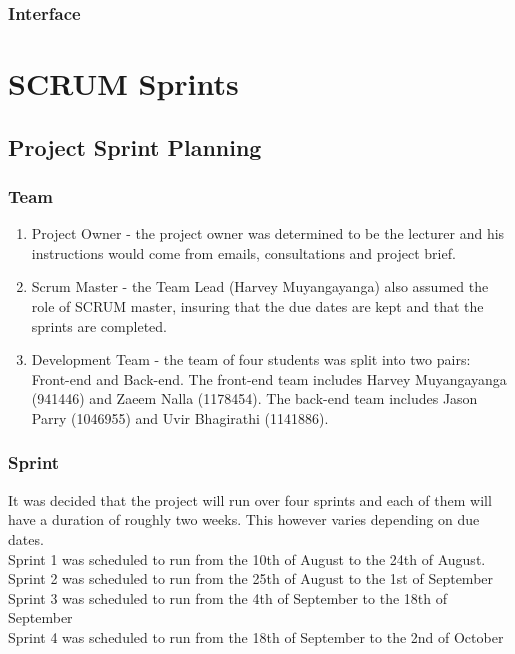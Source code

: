 \documentclass{article}
\begin{document}
\subsubsection{Interface}

\section{SCRUM Sprints}

\subsection{Project Sprint Planning}
\subsubsection{Team}

\begin{enumerate}
\item Project Owner - the project owner was determined to be the lecturer and his instructions
would come from emails, consultations and project brief.
\item Scrum Master - the Team Lead (Harvey Muyangayanga) also assumed the role of SCRUM
master, insuring that the due dates are kept and that the sprints are completed.
\item Development Team - the team of four students was split into two pairs: Front-end and Back-end.
The front-end team includes Harvey Muyangayanga (941446) and Zaeem Nalla (1178454). The back-end team includes Jason Parry (1046955) and Uvir Bhagirathi (1141886).
\end{enumerate}

\subsubsection{Sprint}
It was decided that the project will run over four sprints and each of them will have a duration of roughly two weeks. This however varies depending on due dates.\\
Sprint 1 was scheduled to run from the 10th of August to the 24th of August.\\
Sprint 2 was scheduled to run from the 25th of August to the 1st of September\\
Sprint 3 was scheduled to run from the 4th of September to the 18th of September\\
Sprint 4 was scheduled to run from the 18th of September to the 2nd of October\\
\end{document}
